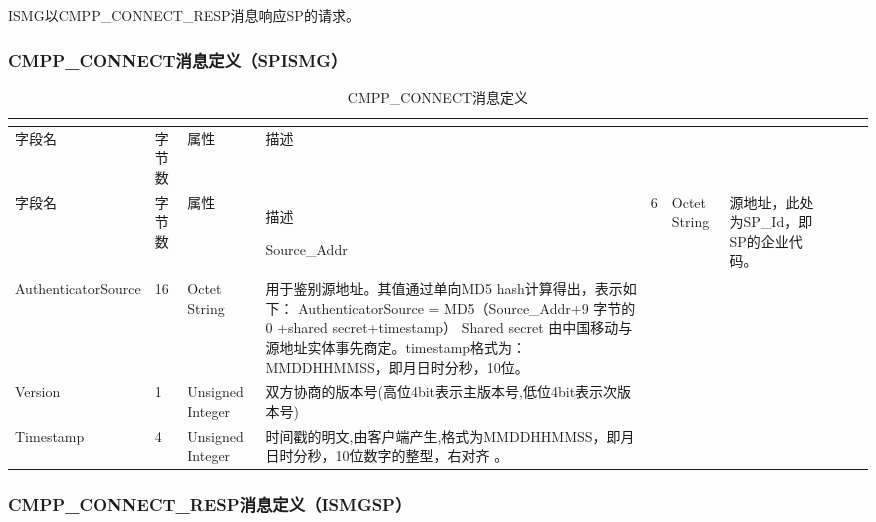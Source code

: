 \documentclass[11pt]{book} %
\begin{document}
ISMG以CMPP\_CONNECT\_RESP消息响应SP的请求。

%
%
%
%
%

\subsubsection{CMPP\_CONNECT消息定义（SP\textrightarrow ISMG）}


\begin{longtable}{|m{90pt}|m{35pt}|m{80pt}|m{200pt}|}
\tabularnewline\hline
字段名&字节数&属性&描述
\endhead

\caption{CMPP\_CONNECT消息定义}\\
\hline
字段名&字节数&属性&描述
\endfirsthead

\endfoot

\endlastfoot

\hline
Source\_Addr&6&Octet String&源地址，此处为SP\_Id，即SP的企业代码。\\
\hline
AuthenticatorSource&16 & Octet String& 用于鉴别源地址。其值通过单向MD5 hash计算得出，表示如下：\newline 
AuthenticatorSource = MD5（Source\_Addr+9 字节的0 +shared secret+timestamp）\newline 
Shared secret 由中国移动与源地址实体事先商定。\newline timestamp格式为：MMDDHHMMSS，即月日时分秒，10位。\\
\hline
Version & 1 & Unsigned Integer& 双方协商的版本号(高位4bit表示主版本号,低位4bit表示次版本号)\\
\hline
Timestamp& 4 & Unsigned Integer& 时间戳的明文,由客户端产生,格式为MMDDHHMMSS，即月日时分秒，10位数字的整型，右对齐 。\\
\hline
\end{longtable}



\subsubsection{CMPP\_CONNECT\_RESP消息定义（ISMG\textrightarrow SP）}
\end{document}
